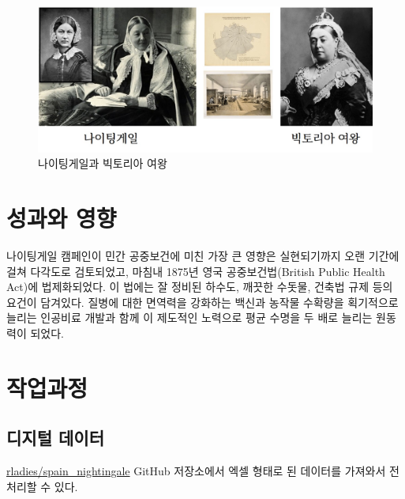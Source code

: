 \documentclass[
  letterpaper,
  chapter,a4paper,showtrims,openright,hidelinks]{oblivoir}
\begin{document}
\begin{figure}

{\centering \includegraphics{images/nightingale_victoria.jpg}

}

\caption{나이팅게일과 빅토리아 여왕}

\end{figure}

\hypertarget{uxc131uxacfcuxc640-uxc601uxd5a5}{%
\section{성과와 영향}\label{uxc131uxacfcuxc640-uxc601uxd5a5}}

나이팅게일 캠페인이 민간 공중보건에 미친 가장 큰 영향은 실현되기까지
오랜 기간에 걸쳐 다각도로 검토되었고, 마침내 1875년 영국
공중보건법(British Public Health Act)에 법제화되었다. 이 법에는 잘
정비된 하수도, 깨끗한 수돗물, 건축법 규제 등의 요건이 담겨있다. 질병에
대한 면역력을 강화하는 백신과 농작물 수확량을 획기적으로 늘리는 인공비료
개발과 함께 이 제도적인 노력으로 평균 수명을 두 배로 늘리는 원동력이
되었다.

\hypertarget{uxc791uxc5c5uxacfcuxc815}{%
\section{작업과정}\label{uxc791uxc5c5uxacfcuxc815}}

\hypertarget{uxb514uxc9c0uxd138-uxb370uxc774uxd130}{%
\subsection{디지털 데이터}\label{uxb514uxc9c0uxd138-uxb370uxc774uxd130}}

\href{https://github.com/rladies/spain_nightingale}{rladies/spain\_nightingale}
GitHub 저장소에서 엑셀 형태로 된 데이터를 가져와서 전처리할 수 있다.
\end{document}

